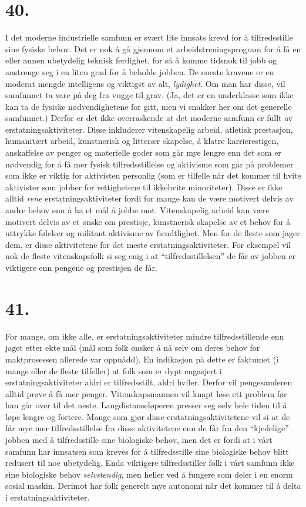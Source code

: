 \documentclass[oneside]{book}
\begin{document}
\section*{40.}
I det moderne industrielle samfunn er svært lite innsats krevd for å
tilfredsstille sine fysiske behov. Det er nok å gå gjennom et
arbeidstreningsprogram for å få en eller annen ubetydelig teknisk ferdighet,
for så å komme tidsnok til jobb og anstrenge seg i en liten grad for å beholde
jobben. De eneste kravene er en moderat mengde intelligens og viktigst av alt,
\emph{lydighet}. Om man har disse, vil samfunnet ta vare på deg fra vugge til
grav. (Ja, det er en underklasse som ikke kan ta de fysiske nødvendighetene for
gitt, men vi snakker her om det generelle samfunnet.) Derfor er det ikke
overraskende at det moderne samfunn er fullt av erstatningsaktiviteter. Disse
inkluderer vitenskapelig arbeid, atletisk prestasjon, humanitært arbeid,
kunstnerisk og litterær skapelse, å klatre karrierestigen, anskaffelse av
penger og materielle goder som går mye lengre enn det som er nødvendig for å få
mer fysisk tilfredsstillelse og aktivisme som går på problemer som ikke er
viktig for aktivisten personlig (som er tilfelle når det kommer til hvite
aktivister som jobber for rettighetene til ikkehvite minoriteter). Disse er
ikke alltid \emph{rene} erstatningsaktiviteter fordi for mange kan de være
motivert delvis av andre behov enn å ha et mål å jobbe mot. Vitenskapelig
arbeid kan være motivert delvis av et ønske om prestisje, kunstnerisk skapelse
av et behov for å uttrykke følelser og militant aktivisme av fiendtlighet. Men
for de fleste som jager dem, er disse aktivitetene for det meste
erstatningsaktiviteter. For eksempel vil nok de fleste vitenskapsfolk si seg
enig i at ``tilfredsstillelsen'' de får av jobben er viktigere enn pengene og
prestisjen de får.

\section*{41.}
For mange, om ikke alle, er erstatningsaktiviteter mindre tilfredsstillende enn
jaget etter ekte mål (mål som folk ønsker å nå selv om deres behov for
maktprosessen allerede var oppnådd). En indikasjon på dette er faktumet (i
mange eller de fleste tilfeller) at folk som er dypt engasjert i
erstatningsaktiviteter aldri er tilfredsstilt, aldri hviler. Derfor vil
pengesamleren alltid prøve å få mer penger. Vitenskapsmannen vil knapt løse ett
problem før han går over til det neste. Langdistanseløperen presser seg selv
hele tiden til å løpe lengre og fortere. Mange som gjør disse
erstatningsaktivitetene vil si at de får mye mer tilfredsstillelse fra disse
aktivitetene enn de får fra den ``kjedelige'' jobben med å tilfredsstille sine
biologiske behov, men det er fordi at i vårt samfunn har innsatsen som kreves
for å tilfredsstille sine biologiske behov blitt redusert til noe ubetydelig.
Enda viktigere tilfredsstiller folk i vårt samfunn ikke sine biologiske behov
\emph{selvstendig}, men heller ved å fungere som deler i en enorm sosial maskin.
Derimot har folk generelt mye autonomi når det kommer til å delta i
erstatningsaktiviteter.
\end{document}
